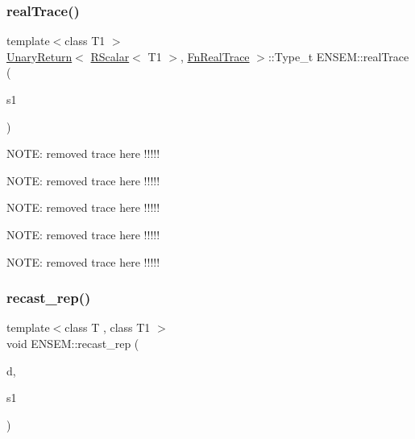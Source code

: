 \mbox{\label{group__rscalar_gad8c5ca0fef5f4bc08eb384e14b4017fa}} 
\subsubsection{\texorpdfstring{realTrace()}{realTrace()}}
{\footnotesize\ttfamily template$<$class T1 $>$ \\
\mbox{\hyperlink{structENSEM_1_1UnaryReturn}{Unary\+Return}}$<$ \mbox{\hyperlink{classENSEM_1_1RScalar}{R\+Scalar}}$<$ T1 $>$, \mbox{\hyperlink{structENSEM_1_1FnRealTrace}{Fn\+Real\+Trace}} $>$\+::Type\+\_\+t E\+N\+S\+E\+M\+::real\+Trace (\begin{DoxyParamCaption}\item[{const \mbox{\hyperlink{classENSEM_1_1RScalar}{R\+Scalar}}$<$ T1 $>$ \&}]{s1 }\end{DoxyParamCaption})\hspace{0.3cm}{\ttfamily [inline]}}

N\+O\+TE\+: removed trace here !!!!!

N\+O\+TE\+: removed trace here !!!!!

N\+O\+TE\+: removed trace here !!!!!

N\+O\+TE\+: removed trace here !!!!!

N\+O\+TE\+: removed trace here !!!!! \mbox{\label{group__rscalar_ga1ecb21d4e8fc1e664055d3fa1145f6e9}} 
\subsubsection{\texorpdfstring{recast\_rep()}{recast\_rep()}}
{\footnotesize\ttfamily template$<$class T , class T1 $>$ \\
void E\+N\+S\+E\+M\+::recast\+\_\+rep (\begin{DoxyParamCaption}\item[{\mbox{\hyperlink{classENSEM_1_1RScalar}{R\+Scalar}}$<$ T $>$ \&}]{d,  }\item[{const \mbox{\hyperlink{classENSEM_1_1RScalar}{R\+Scalar}}$<$ T1 $>$ \&}]{s1 }\end{DoxyParamCaption})\hspace{0.3cm}{\ttfamily [inline]}}



